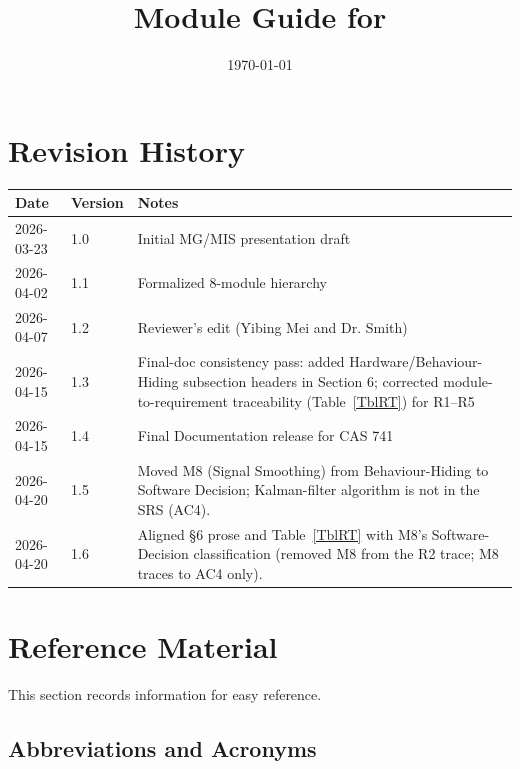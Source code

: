 \documentclass[12pt, titlepage]{article}
\begin{document}
\title{Module Guide for \progname{}} 
\author{\authname}
\date{\today}

\maketitle


\section{Revision History}

\begin{tabularx}{\textwidth}{p{3cm}p{2cm}X}
\toprule {\bf Date} & {\bf Version} & {\bf Notes}\\
\midrule
2026-03-23 & 1.0 & Initial MG/MIS presentation draft\\
2026-04-02 & 1.1 & Formalized 8-module hierarchy\\
2026-04-07 & 1.2 & Reviewer's edit (Yibing Mei and Dr. Smith)\\
2026-04-15 & 1.3 & Final-doc consistency pass: added Hardware/Behaviour-Hiding subsection headers in Section 6; corrected module-to-requirement traceability (Table~\ref{TblRT}) for R1--R5\\
2026-04-15 & 1.4 & Final Documentation release for CAS 741\\
2026-04-20 & 1.5 & Moved M8 (Signal Smoothing) from Behaviour-Hiding to Software Decision; Kalman-filter algorithm is not in the SRS (AC4).\\
2026-04-20 & 1.6 & Aligned \S6 prose and Table~\ref{TblRT} with M8's Software-Decision classification (removed M8 from the R2 trace; M8 traces to AC4 only).\\
\bottomrule
\end{tabularx}

\newpage

\section{Reference Material}

This section records information for easy reference. 

\subsection{Abbreviations and Acronyms}
\end{document}
